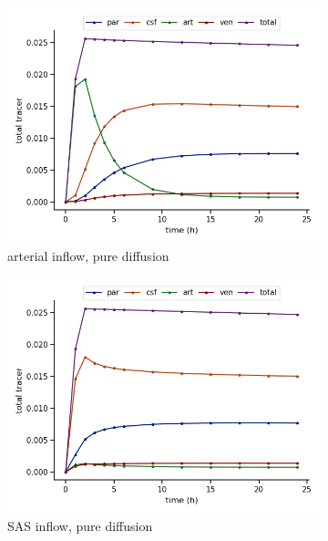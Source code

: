 \documentclass[fleqn,10pt]{wlscirep}
\begin{document}
\begin{figure}
     \centering
     \begin{subfigure}[b]{0.33\textwidth}
         \centering
         \includegraphics[width=\textwidth]{modelA_total_conc.png}
         \caption{arterial inflow, pure diffusion}
         \label{fig:y equals x}
     \end{subfigure}
     \hfill
     \begin{subfigure}[b]{0.33\textwidth}
         \centering
         \includegraphics[width=\textwidth]{modelB_total_conc.png}
         \caption{SAS inflow, pure diffusion}
         \label{fig:three sin x}
     \end{subfigure}
     \hfill
     \begin{subfigure}[b]{0.33\textwidth}

\end{subfigure}
\end{figure}
\end{document}
